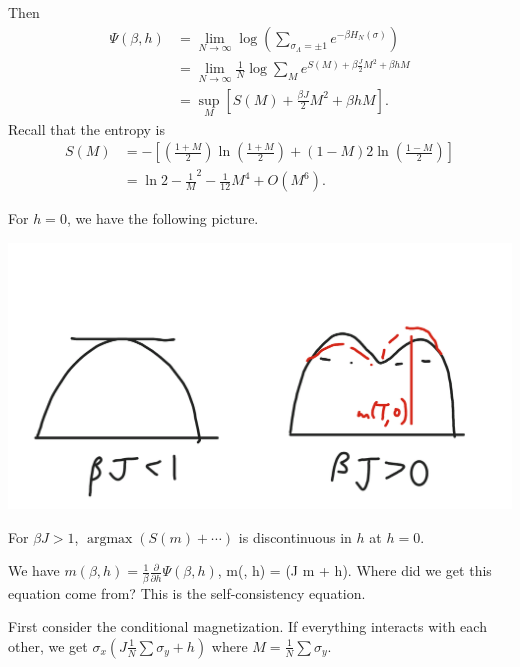Then
\begin{align}
\Psi(\beta, h)&=\lim_{N\to \infty} \log\left( {\sum_{\sigma_\Lambda = \pm1} e^{-\beta H_N(\sigma)}} \right)\\
&= \lim_{N\to \infty} \frac{1}{N} \log \sum_M e^{S(M)+\beta \frac{J}{2}M^2 + \beta h M}\\
&=\sup_M [S(M) + \frac{\beta J}{2}M^2 + \beta hM].
\end{align}
Recall that the entropy is 
\begin{align}
S(M) &= -\left[ {\left( {\frac{1+M}{2}} \right) \ln \left( {\frac{1+M}{2}} \right) + \left( {1-M} \right){2}\ln \left( {\frac{1-M}{2}} \right)} \right]\\
&=\ln 2 - \frac{1}{M}^2  - \frac{1}{12}M^4 + O(M^6).
\end{align}

For $h=0$, we have the following picture. 

\begin{center}\includegraphics[scale=.25]{images/4-26-4}\end{center}


For $\beta J>1$, $\operatorname{argmax}(S(m) +\cdots)$ is discontinuous in $h$ at $h=0$.

We have $m(\beta,h)= \frac{1}{\beta} \frac{\partial}{\partial h}\Psi(\beta, h)$, 
\be
m(\beta, h) = \tanh(\beta J m + \beta h).
\ee
Where did we get this equation come from? This is the self-consistency equation. 

First consider the conditional magnetization. If everything interacts with each other, we get $\sigma_x(J\frac{1}{N} \sum \sigma_y + h)$ where $M=\frac{1}{N} \sum \sigma_y$. %

